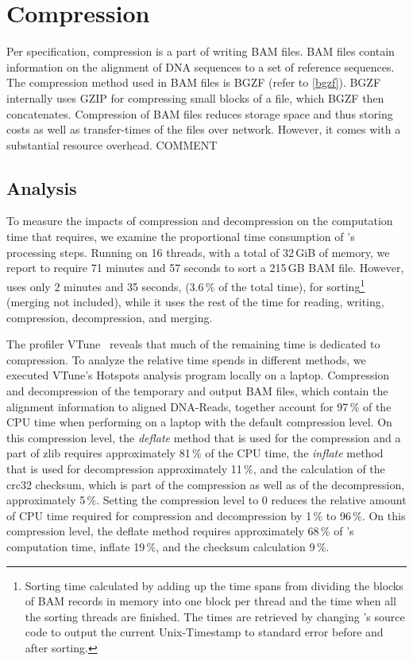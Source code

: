 \section{Compression}\label{compression}
Per specification, compression is a part of writing BAM files. BAM files contain information on the alignment of DNA sequences to a set of reference sequences. The compression method used in BAM files is BGZF (refer to \ref{bgzf}). BGZF internally uses GZIP for compressing small blocks of a file, which BGZF then concatenates. Compression of BAM files reduces storage space and thus storing costs as well as transfer-times of the files over network. However, it comes with a substantial resource overhead. 
COMMENT

\subsection{Analysis}
To measure the impacts of compression and decompression on the computation time that \sort requires, we examine the proportional time consumption of \sort's processing steps. 
Running on 16 threads, with a total of 32\,GiB of memory, we report \sort to require 71 minutes and 57 seconds to sort a 215\,GB BAM file. However, \sort uses only 2 minutes and 35 seconds, (3.6\,\% of the total time), for sorting\footnote{Sorting time calculated by adding up the time spans from dividing the blocks of BAM records in memory into one block per thread and the time when all the sorting threads are finished. The times are retrieved by changing \sort's source code to output the current Unix-Timestamp to standard error before and after sorting.} (merging not included), while it uses the rest of the time for reading, writing, compression, decompression, and merging.

The profiler VTune~\cite{noauthor_fix_nodate} reveals that much of the remaining time is dedicated to compression. To analyze the relative time \sort spends in different methods, we executed VTune's Hotspots analysis program locally on a laptop.
Compression and decompression of the temporary and output BAM files, which contain the alignment information to aligned DNA-Reads, together account for 97\,\% of the CPU time when performing \sort on a laptop with the default compression level. On this compression level, the \textit{deflate} method that is used for the compression and a part of zlib requires approximately 81\,\% of the CPU time, the \textit{inflate} method that is used for decompression approximately 11\,\%, and the calculation of the crc32 checksum, which is part of the compression as well as of the decompression, approximately 5\,\%. Setting the compression level to 0 reduces the relative amount of CPU time required for compression and decompression by 1\,\% to 96\,\%. On this compression level, the deflate method requires approximately 68\,\% of \sort's computation time, inflate 19\,\%, and the checksum calculation 9\,\%.


